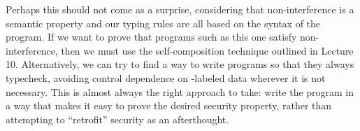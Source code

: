 \documentclass[11pt,twoside]{scrartcl}
\begin{document}
Perhaps this should not come as a surprise, considering that non-interference is a semantic property and our typing rules are all based on the syntax of the program. If we want to prove that programs such as this one satisfy non-interference, then we must use the self-composition technique outlined in Lecture 10. Alternatively, we can try to find a way to write programs so that they always typecheck, avoiding control dependence on \hisec-labeled data wherever it is not necessary. This is almost always the right approach to take: write the program in a way that makes it easy to prove the desired security property, rather than attempting to ``retrofit'' security as an afterthought.



\end{document}
